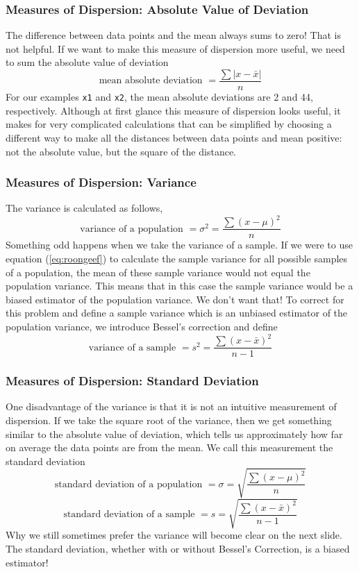 \documentclass[xcolor=dvipsnames]{beamer}
\begin{document}
\begin{frame}
  \frametitle{Measures of Dispersion: Absolute Value of Deviation}
The difference between data points and the mean always sums to zero!
That is not helpful. If we want to make this measure of dispersion
more useful, we need to sum the \alert{absolute value of deviation}
\begin{equation}
  \label{eq:riquithu}
  \mbox{mean absolute deviation }=\frac{\sum{}\vert{}x-\bar{x}\vert}{n}
\end{equation}
For our examples \texttt{x1} and \texttt{x2}, the mean absolute
deviations are 2 and 44, respectively. Although at first glance this
measure of dispersion looks useful, it makes for very complicated
calculations that can be simplified by choosing a different way to
make all the distances between data points and mean positive: not the
absolute value, but the square of the distance.
\end{frame}

\begin{frame}
  \frametitle{Measures of Dispersion: Variance}
The \alert{variance} is calculated as follows,
\begin{equation}
  \label{eq:roongeef}
   \mbox{variance of a population }=\sigma^{2}=\frac{\sum{}(x-\mu)^{2}}{n}
\end{equation}
Something odd happens when we take the variance of a sample. If we
were to use equation (\ref{eq:roongeef}) to calculate the sample
variance for all possible samples of a population, the mean of these
sample variance would not equal the population variance. This means
that in this case the sample variance would be a \alert{biased
  estimator} of the population variance. We don't want that! To
correct for this problem and define a sample variance which is an
\alert{unbiased estimator} of the population variance, we introduce
\alert{Bessel's correction} and define
\begin{equation}
  \label{eq:ilosoama}
   \mbox{variance of a sample }=s^{2}=\frac{\sum{}(x-\bar{x})^{2}}{n-1}
\end{equation}
\end{frame}

\begin{frame}
  \frametitle{Measures of Dispersion: Standard Deviation}
One disadvantage of the variance is that it is not an intuitive
measurement of dispersion. If we take the square root of the variance,
then we get something similar to the absolute value of deviation,
which tells us approximately how far on average the data points are
from the mean. We call this measurement the \alert{standard
  deviation}
\begin{equation}
  \label{eq:boolaesh}
   \mbox{standard deviation of a population }=\sigma=\sqrt{\frac{\sum{}(x-\mu)^{2}}{n}}
\end{equation}
\begin{equation}
  \label{eq:xeiroong}
   \mbox{standard deviation of a sample }=s=\sqrt{\frac{\sum{}(x-\bar{x})^{2}}{n-1}}
\end{equation}
Why we still sometimes prefer the variance will become
clear on the next slide. The standard deviation, whether with or
without Bessel's Correction, is a biased estimator!
\end{frame}
\end{document}
